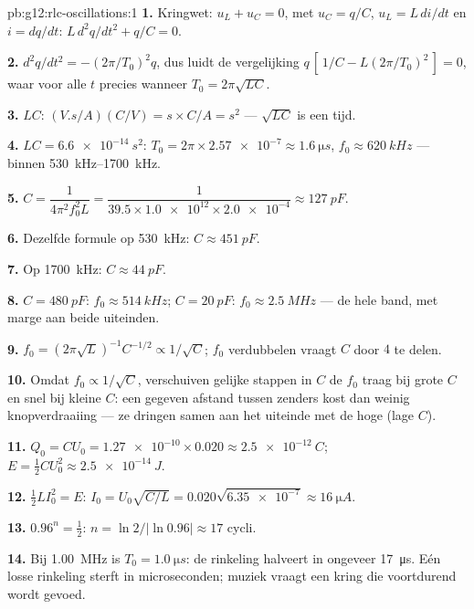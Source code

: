 \begin{solution}{pb:g12:rlc-oscillations:1}
\textbf{1.} Kringwet: $u_L + u_C = 0$, met $u_C = q/C$, $u_L = L\,di/dt$ en
$i = dq/dt$: $L\,d^2q/dt^2 + q/C = 0$.

\textbf{2.} $d^2q/dt^2 = -(2\pi/T_0)^2 q$, dus luidt de vergelijking
$q\,[\,1/C - L(2\pi/T_0)^2\,] = 0$, waar voor alle $t$ precies wanneer
$T_0 = 2\pi\sqrt{LC}$.

\textbf{3.} $LC$: $(\unit{V.s/A})(\unit{C/V}) = \unit{s} \times
\unit{C/A} = \unit{s^2}$ --- $\sqrt{LC}$ is een tijd.

\textbf{4.} $LC = \qty{6.6e-14}{s^2}$: $T_0 = 2\pi \times \num{2.57e-7}
\approx \qty{1.6}{\micro s}$, $f_0 \approx \qty{620}{kHz}$ --- binnen
\qtyrange{530}{1700}{kHz}.

\textbf{5.} $C = \dfrac{1}{4\pi^2 f_0^2 L} = \dfrac{1}{39.5 \times
\num{1.0e12} \times \num{2.0e-4}} \approx \qty{127}{pF}$.

\textbf{6.} Dezelfde formule op \qty{530}{kHz}: $C \approx \qty{451}{pF}$.

\textbf{7.} Op \qty{1700}{kHz}: $C \approx \qty{44}{pF}$.

\textbf{8.} $C = \qty{480}{pF}$: $f_0 \approx \qty{514}{kHz}$;
$C = \qty{20}{pF}$: $f_0 \approx \qty{2.5}{MHz}$ --- de hele band, met marge
aan beide uiteinden.

\textbf{9.} $f_0 = (2\pi\sqrt{L})^{-1}C^{-1/2} \propto 1/\sqrt{C}$; $f_0$
verdubbelen vraagt $C$ door $4$ te delen.

\textbf{10.} Omdat $f_0 \propto 1/\sqrt{C}$, verschuiven gelijke stappen in
$C$ de $f_0$ traag bij grote $C$ en snel bij kleine $C$: een gegeven afstand
tussen zenders kost dan weinig knopverdraaiing --- ze dringen samen aan het
uiteinde met de hoge  (lage $C$).

\textbf{11.} $Q_0 = CU_0 = \num{1.27e-10} \times 0.020 \approx
\qty{2.5e-12}{C}$; $E = \tfrac12 CU_0^2 \approx \qty{2.5e-14}{J}$.

\textbf{12.} $\tfrac12 LI_0^2 = E$: $I_0 = U_0\sqrt{C/L} =
0.020\sqrt{\num{6.35e-7}} \approx \qty{16}{\micro A}$.

\textbf{13.} $0.96^n = \tfrac12$: $n = \ln 2/\lvert\ln 0.96\rvert
\approx 17$ cycli.

\textbf{14.} Bij \qty{1.00}{MHz} is $T_0 = \qty{1.0}{\micro s}$: de rinkeling
halveert in ongeveer \qty{17}{\micro s}. Eén losse rinkeling sterft in
microseconden; muziek vraagt een kring die voortdurend wordt gevoed.


\end{solution}
